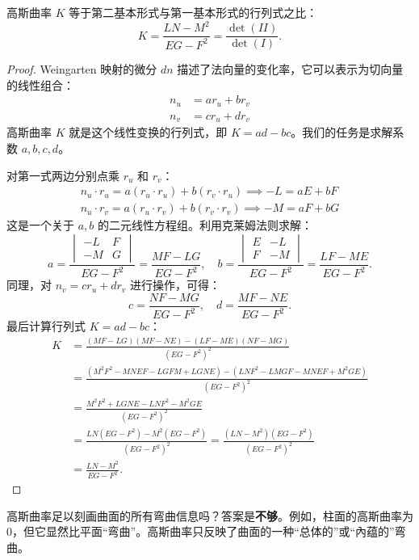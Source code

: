 \documentclass[lang=cn,10pt,thmcnt=section]{elegantbook}
\begin{document}
\begin{proposition}\label{prop:K_det_ratio}
    高斯曲率 $K$ 等于第二基本形式与第一基本形式的行列式之比：
    \[
    K = \frac{LN - M^2}{EG - F^2} = \frac{\det(II)}{\det(I)}.
    \]
\end{proposition}
\begin{proof}
    Weingarten 映射的微分 $dn$ 描述了法向量的变化率，它可以表示为切向量的线性组合：
    \begin{align*}
        n_u &= a r_u + b r_v \\
        n_v &= c r_u + d r_v
    \end{align*}
    高斯曲率 $K$ 就是这个线性变换的行列式，即 $K = ad-bc$。我们的任务是求解系数 $a,b,c,d$。
    
    对第一式两边分别点乘 $r_u$ 和 $r_v$：
    \begin{align*}
        n_u \cdot r_u = a(r_u \cdot r_u) + b(r_v \cdot r_u) \implies -L = aE + bF \\
        n_u \cdot r_v = a(r_u \cdot r_v) + b(r_v \cdot r_v) \implies -M = aF + bG
    \end{align*}
    这是一个关于 $a, b$ 的二元线性方程组。利用克莱姆法则求解：
    \[
    a = \frac{\begin{vmatrix} -L & F \\ -M & G \end{vmatrix}}{EG-F^2} = \frac{MF - LG}{EG - F^2}, \quad
    b = \frac{\begin{vmatrix} E & -L \\ F & -M \end{vmatrix}}{EG-F^2} = \frac{LF - ME}{EG - F^2}.
    \]
    同理，对 $n_v = c r_u + d r_v$ 进行操作，可得：
    \[
    c = \frac{NF - MG}{EG - F^2}, \quad
    d = \frac{MF - NE}{EG - F^2}.
    \]
    最后计算行列式 $K = ad - bc$：
    \begin{align*}
        K &= \frac{(MF - LG)(MF - NE) - (LF - ME)(NF - MG)}{(EG-F^2)^2} \\
        &= \frac{(M^2F^2 - MNEF - LGFM + LGNE) - (LNF^2 - LMGF - MNEF + M^2GE)}{(EG-F^2)^2} \\
        &= \frac{M^2F^2 + LGNE - LNF^2 - M^2GE}{(EG-F^2)^2} \\
        &= \frac{LN(EG-F^2) - M^2(EG-F^2)}{(EG-F^2)^2} = \frac{(LN-M^2)(EG-F^2)}{(EG-F^2)^2} \\
        &= \frac{LN-M^2}{EG-F^2}.
    \end{align*}
\end{proof}
\begin{remark}
    高斯曲率足以刻画曲面的所有弯曲信息吗？答案是\textbf{不够}。例如，柱面的高斯曲率为 0，但它显然比平面“弯曲”。高斯曲率只反映了曲面的一种“总体的”或“內蕴的”弯曲。
\end{remark}
\end{document}
